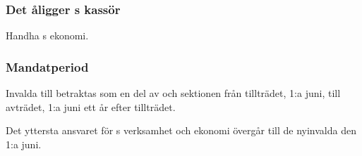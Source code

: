 \subsubsection{Det åligger \FANBARERIT{}s kassör}
\begin{att}
	\item Handha \FANBARERIT{}s ekonomi.
\end{att}

\subsubsection{Mandatperiod}
Invalda till \FANBARERIT{} betraktas som en del av \FANBARERIT{} och sektionen från tillträdet, 1:a juni, till avträdet, 1:a juni ett år efter tillträdet.

Det yttersta ansvaret för \FANBARERIT{}s verksamhet och ekonomi övergår till de nyinvalda den 1:a juni.
